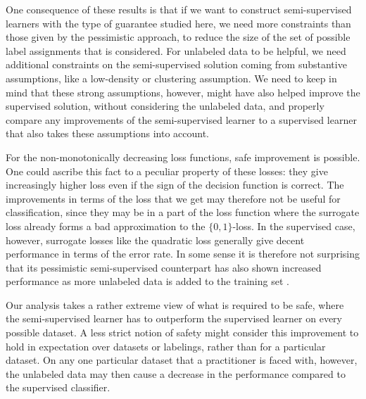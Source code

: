 \documentclass[twoside]{memoir}\usepackage[]{graphicx}\usepackage{xcolor}
\begin{document}
One consequence of these results is that if we want to construct semi-supervised learners with the type of guarantee studied here, we need more constraints than those given by the pessimistic approach, to reduce the size of the set of possible label assignments that is considered. For unlabeled data to be helpful, we need additional constraints on the semi-supervised solution coming from substantive assumptions, like a low-density or clustering assumption. We need to keep in mind that these strong assumptions, however, might have also helped improve the supervised solution, without considering the unlabeled data, and properly compare any improvements of the semi-supervised learner to a supervised learner that also takes these assumptions into account.

For the non-monotonically decreasing loss functions, safe improvement is possible. One could ascribe this fact to a peculiar property of these losses: they give increasingly higher loss even if the sign of the decision function is correct. The improvements in terms of the loss that we get may therefore not be useful for classification, since they may be in a part of the loss function where the surrogate loss already forms a bad approximation to the $\{0,1\}$-loss. In the supervised case, however, surrogate losses like the quadratic loss generally give decent performance in terms of the error rate. In some sense it is therefore not surprising that its pessimistic semi-supervised counterpart has also shown increased performance as more unlabeled data is added to the training set \citep{Krijthe2017}.

Our analysis takes a rather extreme view of what is required to be safe, where the semi-supervised learner has to outperform the supervised learner on every possible dataset. A less strict notion of safety might consider this improvement to hold in expectation over datasets or labelings, rather than for a particular dataset. On any one particular dataset that a practitioner is faced with, however, the unlabeled data may then cause a decrease in the performance compared to the supervised classifier.
% 
% 
% 
\end{document}
